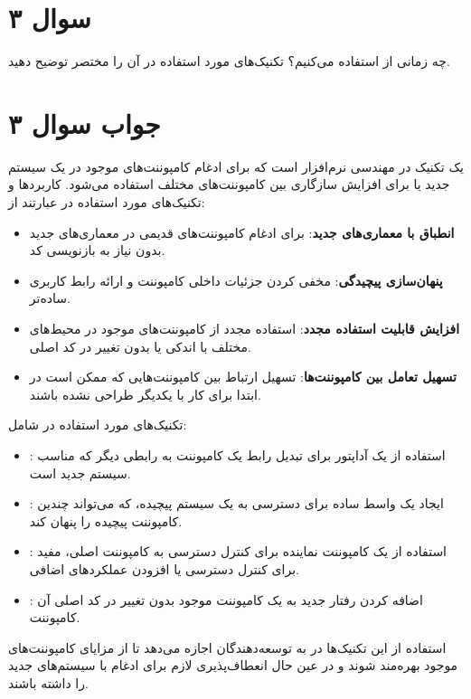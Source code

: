 \section*{سوال ۳}

چه زمانی از
استفاده می‌کنیم؟ تکنیک‌های مورد استفاده در آن را مختصر توضیح دهید.


\section*{جواب سوال ۳}

 یک تکنیک در مهندسی نرم‌افزار است که برای ادغام کامپوننت‌های موجود در یک سیستم جدید یا برای افزایش سازگاری بین کامپوننت‌های مختلف استفاده می‌شود. کاربردها و تکنیک‌های مورد استفاده در  عبارتند از:

\begin{itemize}
	\item \textbf{انطباق با معماری‌های جدید}: برای ادغام کامپوننت‌های قدیمی در معماری‌های جدید بدون نیاز به بازنویسی کد.
	\item \textbf{پنهان‌سازی پیچیدگی}: مخفی کردن جزئیات داخلی کامپوننت و ارائه رابط کاربری ساده‌تر.
	\item \textbf{افزایش قابلیت استفاده مجدد}: استفاده مجدد از کامپوننت‌های موجود در محیط‌های مختلف با اندکی یا بدون تغییر در کد اصلی.
	\item \textbf{تسهیل تعامل بین کامپوننت‌ها}: تسهیل ارتباط بین کامپوننت‌هایی که ممکن است در ابتدا برای کار با یکدیگر طراحی نشده باشند.
\end{itemize}

تکنیک‌های مورد استفاده در  شامل:

\begin{itemize}
	\item \textbf{}: استفاده از یک آداپتور برای تبدیل رابط یک کامپوننت به رابطی دیگر که مناسب سیستم جدید است.
	\item \textbf{}: ایجاد یک واسط ساده برای دسترسی به یک سیستم پیچیده، که می‌تواند چندین کامپوننت پیچیده را پنهان کند.
	\item \textbf{}: استفاده از یک کامپوننت نماینده برای کنترل دسترسی به کامپوننت اصلی، مفید برای کنترل دسترسی یا افزودن عملکردهای اضافی.
	\item \textbf{}: اضافه کردن رفتار جدید به یک کامپوننت موجود بدون تغییر در کد اصلی آن کامپوننت.
\end{itemize}

استفاده از این تکنیک‌ها در  به توسعه‌دهندگان اجازه می‌دهد تا از مزایای کامپوننت‌های موجود بهره‌مند شوند و در عین حال انعطاف‌پذیری لازم برای ادغام با سیستم‌های جدید را داشته باشند.